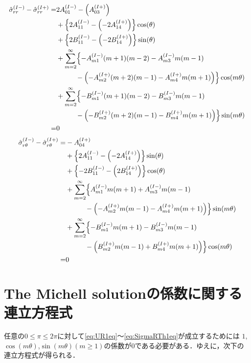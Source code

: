 \begin{align}
	\hat{\sigma}_{rr}^{(I-)}-\hat{\sigma}_{rr}^{(I+)} =
	&2A_{01}^{(I-)}-\Bigl(A_{03}^{(I+)}\Bigr)
	\nonumber
	\\
	&+\Bigl\{2A_{11}^{(I-)}
	-\Bigl(-2A_{14}^{(I+)}\Bigr)\Bigr\}\cos(\theta)
	\nonumber
	\\
	&+\Bigl\{2B_{11}^{(I-)}
	-\Bigl(-2B_{14}^{(I+)}\Bigr)\Bigr\}\sin(\theta)
	\nonumber
	\\
	&+\sum_{m=2}^{\infty}\Bigl\{
	-A_{m1}^{(I-)}(m+1)(m-2)-A_{m3}^{(I-)}m(m-1)
	\nonumber
	\\
	&\hspace{1.0cm}-\Bigl(-A_{m2}^{(I+)}(m+2)(m-1)-A_{m4}^{(I+)}m(m+1)\Bigr)
	\Bigr\}\cos(m\theta)
	\nonumber
	\\
	&+\sum_{m=2}^{\infty}\Bigl\{
	-B_{m1}^{(I-)}(m+1)(m-2)-B_{m3}^{(I-)}m(m-1)
	\nonumber
	\\
	&\hspace{1.0cm}-\Bigl(-B_{m2}^{(I+)}(m+2)(m-1)-B_{m4}^{(I+)}m(m+1)\Bigr)
	\Bigr\}\sin(m\theta)
	\nonumber
	\\
	=&0
	\label{eq:SigmaRReq}
\end{align}
\begin{align}
	\hat{\sigma}_{r\theta}^{(I-)}-\hat{\sigma}_{r\theta}^{(I+)} =
	&-A_{04}^{(I+)}
	\nonumber
	\\
	&+\Bigl\{2A_{11}^{(I-)}
	-\Bigl(-2A_{14}^{(I+)}\Bigr)\Bigr\}\sin(\theta)
	\nonumber
	\\
	&+\Bigl\{-2B_{11}^{(I-)}
	-\Bigl(2B_{14}^{(I+)}\Bigr)\Bigr\}\cos(\theta)
	\nonumber
	\\
	&+\sum_{m=2}^{\infty}\Bigl\{
 	A_{m1}^{(I-)}m(m+1)+A_{m3}^{(I-)}m(m-1)
	\nonumber
	\\
	&\hspace{1.0cm}-\Bigl(-A_{m2}^{(I+)}m(m-1)-A_{m4}^{(I+)}m(m+1)\Bigr)
	\Bigr\}\sin(m\theta)
	\nonumber
	\\
	&+\sum_{m=2}^{\infty}\Bigl\{
	-B_{m1}^{(I-)}m(m+1)-B_{m3}^{(I-)}m(m-1)
	\nonumber
	\\
	&\hspace{1.0cm}-\Bigl(B_{m2}^{(I+)}m(m-1)+B_{m4}^{(I+)}m(m+1)\Bigr)
	\Bigr\}\cos(m\theta)
	\nonumber
	\\
	=&0
	\label{eq:SigmaRTh1eq}
\end{align}
\newpage

\section{The Michell solutionの係数に関する連立方程式}
任意の$0\leq\pi\leq2\pi$に対して\eqref{eq:UR1eq}～\eqref{eq:SigmaRTh1eq}が成立するためには
$1$,$\cos(m\theta)$,$\sin(m\theta)$$(m\geq1)$の係数が0である必要がある．ゆえに，次下の連立方程式が得られる．

